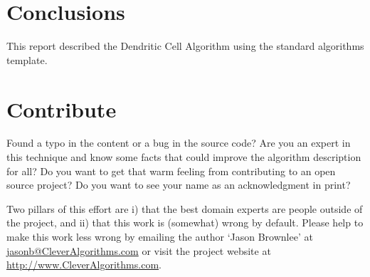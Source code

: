 \documentclass[a4paper, 11pt]{article}
\makeatletter
\newcommand{\myreportauthor}{Jason Brownlee}
\newcommand{\myreportemail}{jasonb@CleverAlgorithms.com}
\newcommand{\myreportwebsite}{http://www.CleverAlgorithms.com}
\makeatother
\begin{document}
% 
% 
\section{Conclusions}
\label{sec:conclusions}
This report described the Dendritic Cell Algorithm using the standard algorithms template.

% 
% 
\section{Contribute}
\label{sec:contribute}
Found a typo in the content or a bug in the source code? 
Are you an expert in this technique and know some facts that could improve the algorithm description for all?
Do you want to get that warm feeling from contributing to an open source project? 
Do you want to see your name as an acknowledgment in print?

Two pillars of this effort are i) that the best domain experts are people outside of the project, and ii) that this work is (somewhat) wrong by default. 
Please help to make this work less wrong by emailing the author `\myreportauthor' at \url{\myreportemail} or visit the project website at \url{\myreportwebsite}.



\end{document}
